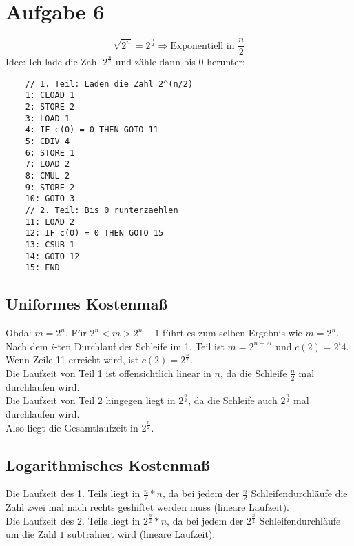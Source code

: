 \documentclass[a4paper,11pt]{scrartcl}
\begin{document}
	\newpage
	
	\section*{Aufgabe 6}
	\[\sqrt{2^n}=2^{\frac{n}{2}} \Rightarrow \text{Exponentiell in } \frac{n}{2}\]
	Idee: Ich lade die Zahl $2^{\frac{n}{2}}$ und zähle dann bis $0$ herunter:
	\begin{lstlisting}
	// 1. Teil: Laden die Zahl 2^(n/2)
	1: CLOAD 1
	2: STORE 2
	3: LOAD 1
	4: IF c(0) = 0 THEN GOTO 11
	5: CDIV 4
	6: STORE 1
	7: LOAD 2
	8: CMUL 2
	9: STORE 2
	10: GOTO 3
	// 2. Teil: Bis 0 runterzaehlen
	11: LOAD 2
	12: IF c(0) = 0 THEN GOTO 15
	13: CSUB 1
	14: GOTO 12
	15: END
	\end{lstlisting}
	
	\subsection*{Uniformes Kostenmaß}
	Obda: $m=2^n$. Für $2^n < m > 2^n-1$ führt es zum selben Ergebnis wie $m=2^n$.\\
	Nach dem $i$-ten Durchlauf der Schleife im 1. Teil ist $m=2^{n-2i}$ und $c(2) = 2^i4$. \\
	Wenn Zeile 11 erreicht wird, ist $c(2) = 2^{\frac{n}{2}}$.\\
	Die Laufzeit von Teil 1 ist offensichtlich linear in $n$, da die Schleife $\frac{n}{2}$ mal durchlaufen wird.\\
	Die Laufzeit von Teil 2 hingegen liegt in $2^{\frac{n}{2}}$, da die Schleife auch $2^{\frac{n}{2}}$ mal durchlaufen wird.\\
	Also liegt die Gesamtlaufzeit in $2^{\frac{n}{2}}$.
	
	\subsection*{Logarithmisches Kostenmaß}
	Die Laufzeit des 1. Teils liegt in $\frac{n}{2} * n$, da bei jedem der $\frac{n}{2}$ Schleifendurchläufe die Zahl zwei mal nach rechts geshiftet werden muss (lineare Laufzeit). \\
	Die Laufzeit des 2. Teils liegt in $2^{\frac{n}{2}} * n$, da bei jedem der $2^{\frac{n}{2}}$ Schleifendurchläufe um die Zahl $1$ subtrahiert wird (lineare Laufzeit).
	
	\newpage
	
\end{document}
